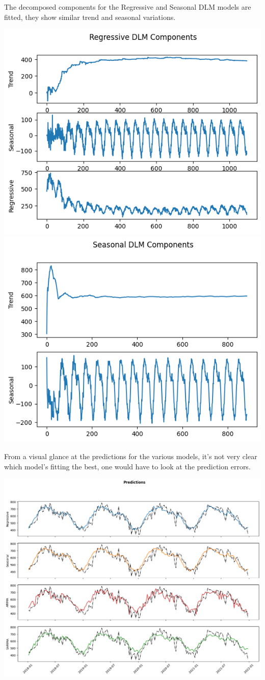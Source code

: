 \documentclass[a4paper,12pt]{article}
\begin{document}
The decomposed components for the Regressive and Seasonal DLM models are fitted, they show similar trend and seasonal variations.

\begin{center}
\includegraphics[width=0.45\linewidth]{./images/bhadla/weeklyRegDecomp.png}
\includegraphics[width=0.45\linewidth]{./images/bhadla/weeklySeasDecomp.png}
\end{center}

From a visual glance at the predictions for the various models, it's not very clear which model's fitting the best, one would have to look at the prediction errors.

\begin{center}
\includegraphics[width=1.00\textwidth]{./images/bhadla/weeklyPred.png}
\end{center}
\end{document}
